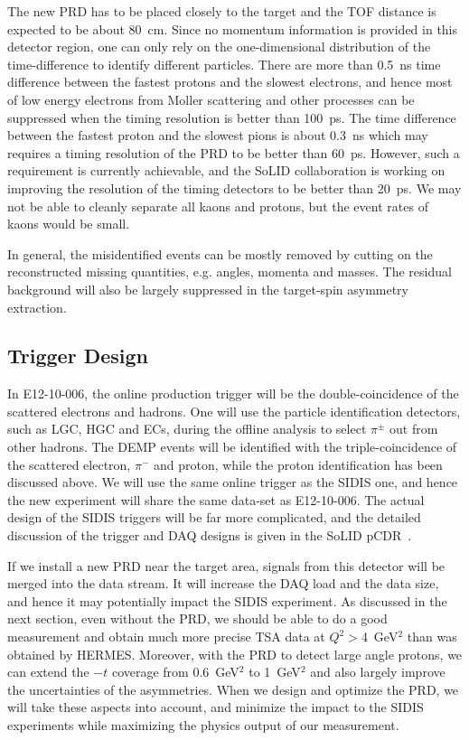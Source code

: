 The new PRD has to be placed closely to the target and the TOF distance is
expected to be about 80~cm. Since no momentum information is provided in this
detector region, one can only rely on the one-dimensional distribution of the
time-difference to identify different particles. There are more than 0.5~ns
time difference between the fastest protons and the slowest electrons, and
hence most of low energy electrons from Moller scattering and other processes
can be suppressed when the timing resolution is better than 100~ps. The time
difference between the fastest proton and the slowest pions is about 0.3~ns
which may requires a timing resolution of the PRD to be better than 60~ps.
However, such a requirement is currently achievable, and the SoLID
collaboration is working on improving the resolution of the timing detectors to
be better than 20~ps. We may not be able to cleanly separate all kaons and
protons, but the event rates of kaons would be small.

In general, the misidentified events can be mostly removed by cutting on the
reconstructed missing quantities, e.g. angles, momenta and masses. The residual
background will also be largely suppressed in the target-spin asymmetry
extraction.

\subsection{Trigger Design}

In E12-10-006, the online production trigger will be the double-coincidence of
the scattered electrons and hadrons. One will use the particle identification
detectors, such as LGC, HGC and ECs, during the offline analysis to select
$\pi^{\pm}$ out from other hadrons. The DEMP events will be identified with the
triple-coincidence of the scattered electron, $\pi^{-}$ and proton, while the
proton identification has been discussed above. We will use the same online
trigger as the SIDIS one, and hence the new experiment will share the same
data-set as E12-10-006. The actual design of the SIDIS triggers will be far
more complicated, and the detailed discussion of the trigger and DAQ designs is
given in the SoLID pCDR~\cite{solid_pcdr}.

If we install a new PRD near the target area, signals from this detector will
be merged into the data stream. It will increase the DAQ load and the data
size, and hence it may potentially impact the SIDIS experiment.  As discussed in
the next section, even without the PRD, we should be able to do a good
measurement and obtain much more precise TSA data at $Q^{2}>$4~GeV$^{2}$ than
was obtained by HERMES.  Moreover, with the PRD to detect large angle protons,
we can extend the $-t$ coverage from 0.6~GeV$^{2}$ to 1~GeV$^{2}$ and also
largely improve the uncertainties of the asymmetries. When we design and
optimize the PRD, we will take these aspects into account, and minimize the
impact to the SIDIS experiments while maximizing the physics output of our
measurement.
